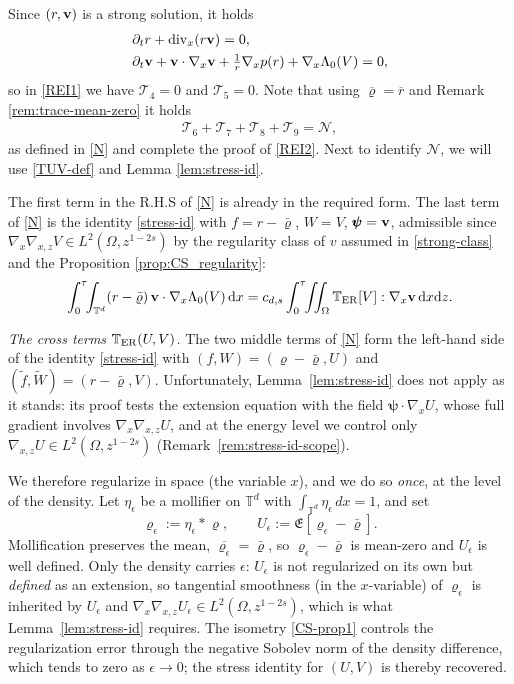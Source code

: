 \documentclass[12pt,a4paper,twoside]{article}
\newcommand{\Ov}[1]{\overline{#1}}
\newcommand{\vr}{\varrho}
\newcommand{\vv}{\vc{v}}
\newcommand{\vc}[1]{{\bf #1}}
\newcommand{\dx}{{\,\rm d} {x}}
\numberwithin{equation}{section}%
\newcommand{\T}{\mathbb{T}}
\newcommand{\dz}{{\rm d} z}
\newcommand{\Gradx}{\nabla_x}
\newcommand{\Gradxz}{\nabla_{x,z}}
\newcommand{\Divx}{\operatorname{div}_x}
\newcommand{\Lambdaz}{\Lambda_0}
\newcommand{\tcbb}{\textcolor{black!30!blue}}
\begin{document}
\begin{pf}
	Since $(r,\vv)$ is a strong solution, it holds
	\begin{align*}
		&\partial_t r+\Divx(r\vv)=0 ,\\
		&\partial_t\vv+\vv\cdot\Gradx\vv+\tfrac1r\Gradx p(r)+\Gradx\Lambdaz(V)=0 ,
	\end{align*}
	so in \eqref{REI1} we have $\mathcal{T}_4=0$ and $\mathcal{T}_5=0$. Note that using $\Ov{\vr}=\Ov{r}$ and Remark \ref{rem:trace-mean-zero} it holds 
	\begin{align*}
		\mathcal{T}_6+\mathcal{T}_7+\mathcal{T}_8+\mathcal{T}_9= \mathcal{N},
	\end{align*}
	as defined in \eqref{N} and complete the proof of \eqref{REI2}. Next to identify $\mathcal N$, we will use \eqref{TUV-def} and Lemma  \ref{lem:stress-id}. 
	
	

	The first term in the R.H.S of \eqref{N} is already in the required form. The last term of \eqref{N} is the identity \eqref{stress-id} with $f=r-\bar\vr$, $W=V$, $\pmb\psi=\vv$, admissible since $\Gradx\Gradxz V\in L^2(\Omega,z^{1-2s})$ by the regularity class of $v$ assumed in \eqref{strong-class} and the Proposition \ref{prop:CS_regularity}: 
	\begin{equation}\label{eq:N-TV}
		\int_0^\tau\!\!\int_{\mathbb T^d}(r-\bar\vr)\,\vv\cdot\Gradx\Lambdaz(V) \dx 
		=c_{d,s}\int_0^\tau\!\!\iint_\Omega\T_{\rm ER}[V]:\Gradx\vv \dx \dz.
	\end{equation}
	


\emph{The cross terms $\T_{\rm ER}(U,V)$.} The two middle terms of \eqref{N} form the left-hand side of the identity \tcbb{\eqref{stress-id}} with $(f,W)=(\vr-\bar\vr,U)$ and $(\widetilde f,\widetilde W)=(r-\bar\vr,V)$. Unfortunately, Lemma~\ref{lem:stress-id} does not apply as it stands: its proof tests the extension equation with the field $\pmb\psi\cdot\Gradx U$, whose full gradient involves $\Gradx\Gradxz U$, and at the energy level we control only $\Gradxz U\in L^2(\Omega,z^{1-2s})$ (Remark~\ref{rem:stress-id-scope}).

We therefore regularize in space (the variable $x$), and we do so \emph{once}, at the level
of the density. Let $\eta_\epsilon$ be a mollifier on $\mathbb T^d$ with
$\int_{\mathbb T^d}\eta_\epsilon\,dx=1$, and set
\[
\vr_\epsilon:=\eta_\epsilon\ast\vr,\qquad U_\epsilon:=\mathfrak E[\vr_\epsilon-\bar\vr].
\]
Mollification preserves the mean, $\overline{\vr_\epsilon}=\bar\vr$, so $\vr_\epsilon-\bar\vr$
is mean-zero and $U_\epsilon$ is well defined. Only the density carries $\epsilon$: $U_\epsilon$
is not regularized on its own but \emph{defined} as an extension, so tangential smoothness (in the $x$-variable) of
$\vr_\epsilon$ is inherited by $U_\epsilon$ and $\Gradx\Gradxz U_\epsilon\in L^2(\Omega,z^{1-2s})$,
which is what Lemma~\ref{lem:stress-id} requires. The isometry \eqref{CS-prop1} controls the regularization error through the negative Sobolev norm of the density difference, which tends to zero as $\epsilon\to0$; the stress identity for $(U,V)$ is thereby recovered.


\end{pf}
\end{document}
